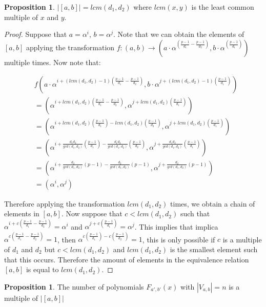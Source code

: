 \documentclass{article}
\theoremstyle{definition}
\newtheorem{prop}[theorem]{Proposition}
\theoremstyle{remark}
\numberwithin{equation}{section}
\begin{document}
\begin{prop}
  
  $|[a, b]| = lcm(d_1,d_2)$ where $lcm(x,y)$ is the least common multiple of $x$ and $y$.

\end{prop}

\begin{proof}

  Suppose that $a=\alpha^i$, $b=\alpha^j$. Note that we can obtain the elements of $[a,b]$ applying the transformation $f:(a,b) \rightarrow ( a\cdot\alpha^{(\frac{p-1}{d_1} - \frac{p-1}{d_2})}, b\cdot\alpha^{(\frac{p-1}{d_1})} )$ multiple times. Now note that:

  \begin{align*}
  & f(a\cdot \alpha^{i+(lcm(d_1,d_2) - 1)(\frac{p-1}{d_1} - \frac{p-1}{d_2})}, b\cdot\alpha^{j+(lcm(d_1,d_2) - 1)(\frac{p-1}{d_1})}) \\
  & = (\alpha^{i+lcm(d_1,d_2)(\frac{p-1}{d_1}-\frac{p-1}{d_2})}, \alpha^{j+lcm(d_1,d_2)(\frac{p-1}{d_1})}) \\
  & = (\alpha^{i+lcm(d_1,d_2)(\frac{p-1}{d_1})-lcm(d_1,d_2)(\frac{p-1}{d_2})}, \alpha^{j+lcm(d_1,d_2)(\frac{p-1}{d_1})}) \\
    & = (\alpha^{i+\frac{d_1d_2}{gcd(d_1,d_2)}(\frac{p-1}{d_1})-\frac{d_1d_2}{gcd(d_1,d_2)}(\frac{p-1}{d_2})}, \alpha^{j+\frac{d_1d_2}{gcd(d_1,d_2)}(\frac{p-1}{d_1})}) \\
  & = (\alpha^{i+\frac{d_2}{gcd(d_1,d_2)}(p-1)-\frac{d_2}{gcd(d_1,d_2)}(p-1)}, \alpha^{j+\frac{d_2}{gcd(d_1,d_2)}(p-1)}) \\
  & = (\alpha^i, \alpha^j)
  \end{align*}

  Therefore applying the transformation $lcm(d_1,d_2)$ times, we obtain a chain of elements in $[a,b]$. Now suppose that $c < lcm(d_1,d_2)$ such that $\alpha^{i+c(\frac{p-1}{d_1} - \frac{p-1}{d_2})} = \alpha^i$ and $\alpha^{j+c(\frac{p-1}{d_1})} = \alpha^j$. This implies that implica $\alpha^{c(\frac{p-1}{d_1} - \frac{p-1}{d_2})} = 1$, then $\alpha^{c(\frac{p-1}{d_1}) - c(\frac{p-1}{d_2})} = 1$, this is only possible if $c$ is a multiple of $d_1$ and $d_2$ but $c < lcm(d_1,d_2)$ and $lcm(d_1,d_2)$ is the smallest element such that this occurs. Therefore the amount of elements in the equivalence relation $[a,b]$ is equal to $lcm(d_1,d_2)$.
  
\end{proof}

\begin{prop}

  The number of polynomials $F_{a', b'}(x)$ with $|V_{a, b}| = n$ is a multiple of $|[a, b]|$

\end{prop}
    
\end{document}
